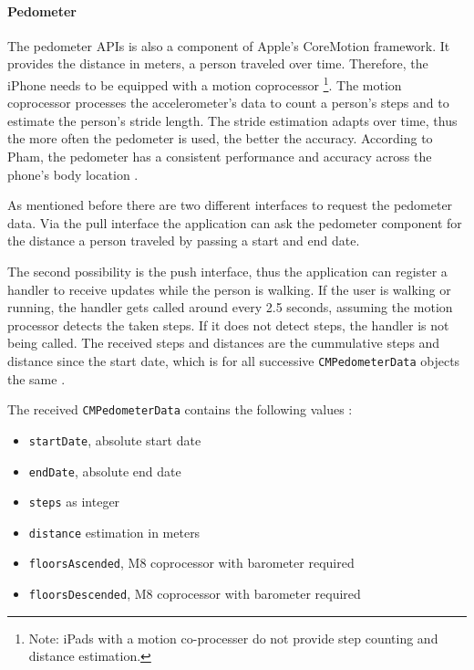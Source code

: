 \paragraph{Pedometer}

The pedometer \acsp{API} is also a component of Apple's CoreMotion framework.
It provides the distance in meters, a person traveled over time.
Therefore, the iPhone needs to be equipped with a motion coprocessor \footnote{Note: iPads with a motion co-processer do not provide step counting and distance estimation.}.
The motion coprocessor processes the accelerometer's data to count a person's steps and to estimate the person's stride length.
The stride estimation adapts over time, thus the more often the pedometer is used, the better the accuracy.
According to Pham, the pedometer has a consistent performance and accuracy across the phone's body location \cite{apple:wwdc_2014_pham}.

As mentioned before there are two different interfaces to request the pedometer data.
Via the pull interface the application can ask the pedometer component for the distance a person traveled by passing a start and end date.

The second possibility is the push interface, thus the application can register a handler to receive updates while the person is walking.
If the user is walking or running, the handler gets called around every 2.5 seconds, assuming the motion processor detects the taken steps.
If it does not detect steps, the handler is not being called.
The received steps and distances are the cummulative steps and distance since the start date, which is for all successive \texttt{CMPedometerData} objects the same \cite{apple:wwdc_2014_pham}.

The received \texttt{CMPedometerData} contains the following values \cite{apple:ios_doc_cm}:
\begin{itemize}
  \item \texttt{startDate}, absolute start date
  \item \texttt{endDate}, absolute end date
  \item \texttt{steps} as integer
  \item \texttt{distance} estimation in meters
  \item \texttt{floorsAscended}, M8 coprocessor with barometer required
  \item \texttt{floorsDescended}, M8 coprocessor with barometer required
\end{itemize}

